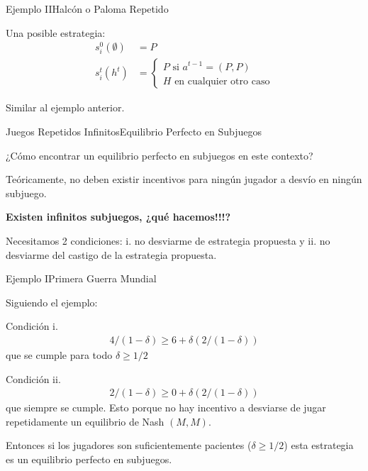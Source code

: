 \documentclass[notes, 11pt]{beamer} %
\newenvironment{wideitemize}{\itemize\addtolength{\itemsep}{10pt}}{\enditemize}
\begin{document}
\begin{frame}{Ejemplo II}{Halc\'on o Paloma Repetido}
	\begin{wideitemize}
		\item<1-> Una posible estrategia: 
		\begin{align*}
			s_{i}^{0}(\emptyset) &= P \\
			s_{i}^{t}(h^{t}) &= \begin{cases}
				P \text{ si } a^{t-1} = (P,P) \\
				H \text{ en cualquier otro caso}
				\end{cases}
		\end{align*}
		\item<2-> Similar al ejemplo anterior.
	\end{wideitemize}
\end{frame}

\begin{frame}{Juegos Repetidos Infinitos}{Equilibrio Perfecto en Subjuegos}
	\begin{wideitemize}
		\item<1-> ¿C\'omo encontrar un equilibrio perfecto en subjuegos en este contexto?
		\item<2-> Te\'oricamente, no deben existir incentivos para ning\'un jugador a desv\'io en ning\'un subjuego.
		\item<3-> \textbf{Existen infinitos subjuegos, ¿qu\'e hacemos!!!?}
		\item<4-> Necesitamos 2 condiciones: i. no desviarme de estrategia propuesta y ii. no desviarme del castigo de la estrategia propuesta.
	\end{wideitemize}
\end{frame}

\begin{frame}{Ejemplo I}{Primera Guerra Mundial}
	\begin{wideitemize}
		\item<1-> Siguiendo el ejemplo: 
			\begin{wideitemize}
				\item<2->[--] Condici\'on i. 
				\begin{align*}
					4/(1-\delta) \geq 6 + \delta (2/(1-\delta))
				\end{align*} que se cumple para todo $\delta \geq 1/2$
				\item<3->[--] Condici\'on ii.
				\begin{align*}
					2/(1-\delta) \geq 0 + \delta (2/(1-\delta))
				\end{align*} que siempre se cumple. Esto porque no hay incentivo a desviarse de jugar repetidamente un equilibrio de Nash $(M,M)$.
				\item<4-> Entonces si los jugadores son suficientemente pacientes ($\delta \geq 1/2$) esta estrategia es un equilibrio perfecto en subjuegos.
			\end{wideitemize}
	\end{wideitemize}
\end{frame}
\end{document}
